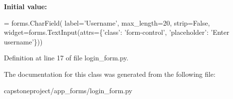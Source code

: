 {\bfseries Initial value\+:}
\begin{DoxyCode}
=  forms.CharField(
        label=\textcolor{stringliteral}{'Username'},
        max\_length=20,
        strip=\textcolor{keyword}{False},
        widget=forms.TextInput(attrs=\{\textcolor{stringliteral}{'class'}: \textcolor{stringliteral}{'form-control'},
                                      \textcolor{stringliteral}{'placeholder'}: \textcolor{stringliteral}{'Enter username'}\}))
\end{DoxyCode}


Definition at line 17 of file login\+\_\+form.\+py.



The documentation for this class was generated from the following file\+:\begin{DoxyCompactItemize}
\item 
capstoneproject/app\+\_\+forms/login\+\_\+form.\+py\end{DoxyCompactItemize}
